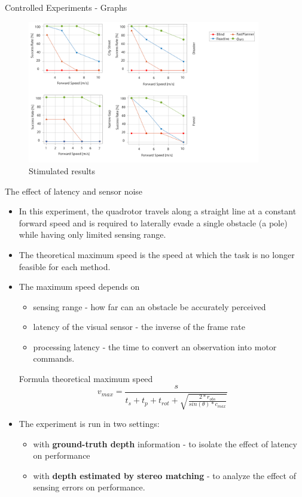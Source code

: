 \documentclass{beamer}
\begin{document}
\begin{frame}{Controlled Experiments - Graphs}
	\begin{figure}
		\includegraphics[width=4in]{controlled-experiments.png}
		\caption{Stimulated results}
	\end{figure}
	
\end{frame}

\begin{frame}[allowframebreaks]{The effect of latency and sensor noise}
	\begin{itemize}
		\item In this experiment, the quadrotor travels along a straight line at a constant forward speed and is required to laterally evade a single obstacle (a pole) while having only limited sensing range.
		\item The theoretical maximum speed is the speed at which the task is no longer feasible for each method. 
		\item The maximum speed depends on 
		\begin{itemize}
			\item sensing range - how far can an obstacle be accurately perceived
			\item latency of the visual sensor - the inverse of the frame rate
			\item processing latency - the time to convert an observation into motor commands.
		\end{itemize} 
	
		\pagebreak
		
		\begin{block}{Formula}
			theoretical maximum speed
			\begin{equation}
				v_{max} = \frac{s}{t_s + t_p + t_{rot} + \sqrt{\frac{2*r_{obs}}{sin(\theta)*c_{max}}}}
			\end{equation}
		\end{block}
		\item The experiment is run in two settings:
		\begin{itemize}
			\item with \textbf{ground-truth depth} information - to isolate the effect of latency on performance
			\item with \textbf{depth estimated by stereo matching}\autocite{stereoMatching} - to analyze the effect of sensing errors on performance.
		\end{itemize}
	\end{itemize}
\end{frame}
\end{document}
